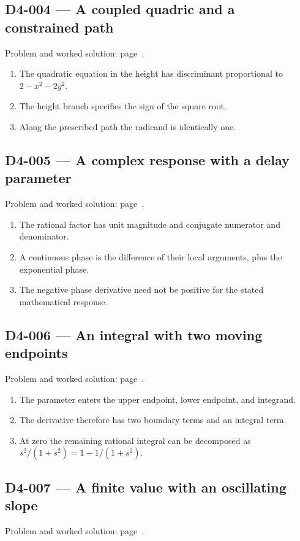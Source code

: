 \documentclass[11pt,oneside,openany]{book}
\begin{document}
\subsection*{D4-004 --- A coupled quadric and a constrained path}
\label{hints:D4-004}
Problem and worked solution: page~\pageref{problem:D4-004}.

\begin{enumerate}
\item The quadratic equation in the height has discriminant proportional to \(2-x^2-2y^2\).
\item The height branch specifies the sign of the square root.
\item Along the prescribed path the radicand is identically one.
\end{enumerate}
\subsection*{D4-005 --- A complex response with a delay parameter}
\label{hints:D4-005}
Problem and worked solution: page~\pageref{problem:D4-005}.

\begin{enumerate}
\item The rational factor has unit magnitude and conjugate numerator and denominator.
\item A continuous phase is the difference of their local arguments, plus the exponential phase.
\item The negative phase derivative need not be positive for the stated mathematical response.
\end{enumerate}
\subsection*{D4-006 --- An integral with two moving endpoints}
\label{hints:D4-006}
Problem and worked solution: page~\pageref{problem:D4-006}.

\begin{enumerate}
\item The parameter enters the upper endpoint, lower endpoint, and integrand.
\item The derivative therefore has two boundary terms and an integral term.
\item At zero the remaining rational integral can be decomposed as \(s^2/(1+s^2)=1-1/(1+s^2)\).
\end{enumerate}
\subsection*{D4-007 --- A finite value with an oscillating slope}
\label{hints:D4-007}
Problem and worked solution: page~\pageref{problem:D4-007}.
\end{document}
